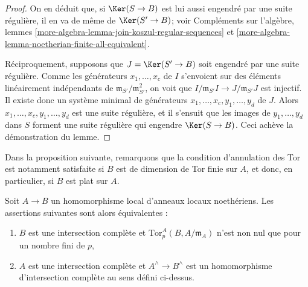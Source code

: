 \begin{proof}
\medskip\noindent
On en déduit que, si $\Ker(S \to B)$ est lui aussi engendré
par une suite régulière, il en va de même de $\Ker(S' \to B)$; voir
Compléments sur l'algèbre, lemmes
\ref{more-algebra-lemma-join-koszul-regular-sequences} et
\ref{more-algebra-lemma-noetherian-finite-all-equivalent}.

\medskip\noindent
Réciproquement, supposons que $J = \Ker(S' \to B)$ soit
engendré par une suite régulière. Comme les générateurs $x_1, \ldots, x_c$
de $I$ s'envoient sur des éléments linéairement indépendants de
$\mathfrak m_{S'}/\mathfrak m_{S'}^2$, on voit que
$I/\mathfrak m_{S'}I \to J/\mathfrak m_{S'}J$ est injectif.
Il existe donc un système minimal de générateurs
$x_1, \ldots, x_c, y_1, \ldots, y_d$ de $J$.
Alors $x_1, \ldots, x_c, y_1, \ldots, y_d$ est une suite
régulière, et il s'ensuit que les images de $y_1, \ldots, y_d$ dans $S$
forment une suite régulière qui engendre $\Ker(S \to B)$.
Ceci achève la démonstration du lemme.
\end{proof}

\noindent
Dans la proposition suivante, remarquons que la condition d'annulation des
Tor est notamment satisfaite si $B$ est de dimension de Tor finie sur $A$,
et donc, en particulier, si $B$ est plat sur $A$.

\begin{proposition}
\label{proposition-avramov-map}
Soit $A \to B$ un homomorphisme local d'anneaux locaux noethériens. Les
assertions suivantes sont alors équivalentes :
\begin{enumerate}
\item $B$ est une intersection complète et
$\text{Tor}^A_p(B, A/\mathfrak m_A)$ n'est non nul que pour un nombre fini de $p$,
\item $A$ est une intersection complète et
$A^\wedge\to B^\wedge$ est un homomorphisme d'intersection
complète au sens défini ci-dessus.
\end{enumerate}
\end{proposition}

